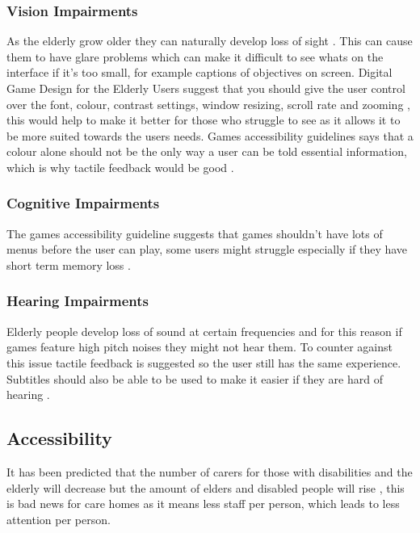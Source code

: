 \documentclass[journal]{IEEEtran}
\begin{document}
\subsubsection{Vision Impairments}
As the elderly grow older they can naturally develop loss of sight \cite{loh_age_2004} \cite{ijsselsteijn_digital_2007}. This can cause them to have glare problems \cite{ijsselsteijn_digital_2007} which can make it difficult to see whats on the interface if it's too small, for example captions of objectives on screen. Digital Game Design for the Elderly Users \cite{ijsselsteijn_digital_2007} suggest that you should give the user control over the font, colour, contrast settings, window resizing, scroll rate and zooming \cite{ijsselsteijn_digital_2007} , this would help to make it better for those who struggle to see as it allows it to be more suited towards the users needs. Games accessibility guidelines \cite{noauthor_game_nodate} says that a colour alone should not be the only way a user can be told essential information, which is why tactile feedback would be good \cite{ijsselsteijn_digital_2007}.

\subsubsection{Cognitive Impairments}
The games accessibility guideline suggests that games shouldn't have lots of menus before the user can play, some users might struggle especially if they have short term memory loss \cite{noauthor_game_nodate}.

\subsubsection{Hearing Impairments}
Elderly people develop loss of sound at certain frequencies \cite{ijsselsteijn_digital_2007} and for this reason if games feature high pitch noises they might not hear them. To counter against this issue tactile feedback is suggested \cite{ijsselsteijn_digital_2007} so the user still has the same experience. Subtitles should also be able to be used to make it easier if they are hard of hearing \cite{noauthor_game_nodate}.

\subsection{Accessibility}
It has been predicted that the number of carers for those with disabilities and the elderly will decrease but the amount of elders and disabled people will rise \cite{hansen_robot_2011}, this is bad news for care homes as it means less staff per person, which leads to less attention per person. 
\end{document}
